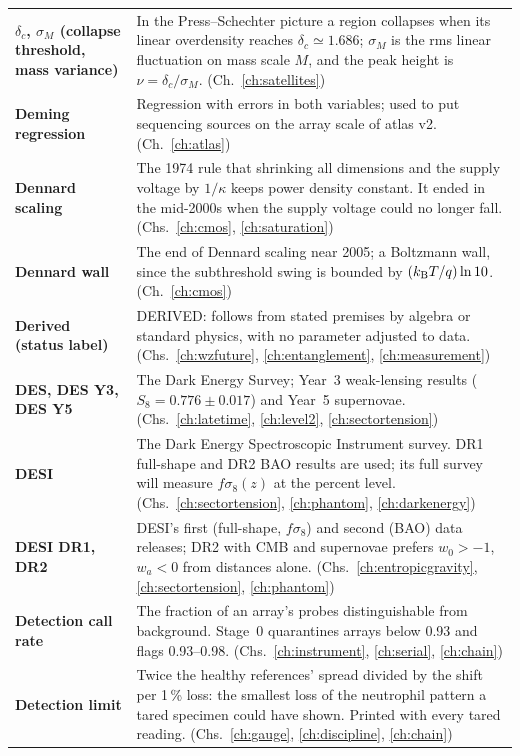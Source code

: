 {\begin{longtable}{@{}>{\raggedright\arraybackslash}p{}>{\raggedright\arraybackslash}p{}@{}}
\textbf{$\delta_c$, $\sigma_M$ (collapse threshold, mass variance)} & In the Press--Schechter picture a region collapses when its linear overdensity reaches $\delta_c\simeq1.686$; $\sigma_M$ is the rms linear fluctuation on mass scale $M$, and the peak height is $\nu=\delta_c/\sigma_M$. {\footnotesize(Ch.~\ref{ch:satellites})}\\[1pt]
\textbf{Deming regression} & Regression with errors in both variables; used to put sequencing sources on the array scale of atlas v2. {\footnotesize(Ch.~\ref{ch:atlas})}\\[1pt]
\textbf{Dennard scaling} & The 1974 rule that shrinking all dimensions and the supply voltage by $1/\kappa$ keeps power density constant. It ended in the mid-2000s when the supply voltage could no longer fall. {\footnotesize(Chs.~\ref{ch:cmos}, \ref{ch:saturation})}\\[1pt]
\textbf{Dennard wall} & The end of Dennard scaling near 2005; a Boltzmann wall, since the subthreshold swing is bounded by $(k_{\mathrm B} T/q)\ln10$. {\footnotesize(Ch.~\ref{ch:cmos})}\\[1pt]
\textbf{Derived (status label)} & DERIVED: follows from stated premises by algebra or standard physics, with no parameter adjusted to data. {\footnotesize(Chs.~\ref{ch:wzfuture}, \ref{ch:entanglement}, \ref{ch:measurement})}\\[1pt]
\textbf{DES, DES Y3, DES Y5} & The Dark Energy Survey; Year~3 weak-lensing results ($S_8=0.776\pm0.017$) and Year~5 supernovae. {\footnotesize(Chs.~\ref{ch:latetime}, \ref{ch:level2}, \ref{ch:sectortension})}\\[1pt]
\textbf{DESI} & The Dark Energy Spectroscopic Instrument survey. DR1 full-shape and DR2 BAO results are used; its full survey will measure $f\sigma_8(z)$ at the percent level. {\footnotesize(Chs.~\ref{ch:sectortension}, \ref{ch:phantom}, \ref{ch:darkenergy})}\\[1pt]
\textbf{DESI DR1, DR2} & DESI's first (full-shape, $f\sigma_8$) and second (BAO) data releases; DR2 with CMB and supernovae prefers $w_0>-1$, $w_a<0$ from distances alone. {\footnotesize(Chs.~\ref{ch:entropicgravity}, \ref{ch:sectortension}, \ref{ch:phantom})}\\[1pt]
\textbf{Detection call rate} & The fraction of an array's probes distinguishable from background. Stage~0 quarantines arrays below 0.93 and flags 0.93--0.98. {\footnotesize(Chs.~\ref{ch:instrument}, \ref{ch:serial}, \ref{ch:chain})}\\[1pt]
\textbf{Detection limit} & Twice the healthy references' spread divided by the shift per 1\,\% loss: the smallest loss of the neutrophil pattern a tared specimen could have shown. Printed with every tared reading. {\footnotesize(Chs.~\ref{ch:gauge}, \ref{ch:discipline}, \ref{ch:chain})}\\[1pt]

\end{longtable}}
